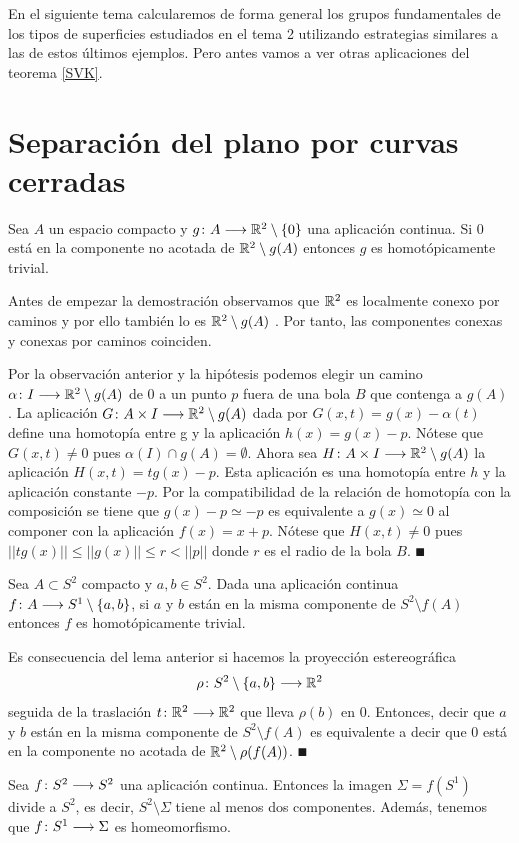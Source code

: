 \documentclass[GTS.tex]{subfiles}
\begin{document}
\vspace{0.4cm}

En el siguiente tema calcularemos de forma general los grupos fundamentales de los tipos de superficies estudiados en el tema 2 utilizando estrategias similares a las de estos últimos ejemplos. Pero antes vamos a ver otras aplicaciones del teorema \ref{SVK}.

\section{Separación del plano por curvas cerradas}

\begin{lemma}
Sea $A$ un espacio compacto y $g\colon{A}\longrightarrow{\mathbb{R}^2\setminus\{0\}}$ una aplicación continua. Si $0$ está en la componente no acotada de $\mathbb{R}^2\setminus g(A)$  entonces $g$ es homotópicamente trivial.
\end{lemma}

Antes de empezar la demostración observamos que $\mathbb{R}^2$ es localmente conexo por caminos y por ello también lo es $\mathbb{R}^2\setminus g(A)$ . Por tanto, las componentes conexas y conexas por caminos coinciden.

\begin{dem}
Por la observación anterior y la hipótesis podemos elegir un camino $\alpha\colon{I}\longrightarrow{\mathbb{R}^2\setminus g(A)}$ de $0$ a un punto $p$ fuera de una bola $B$ que contenga a $g(A)$. La aplicación $G\colon{A\times I}\longrightarrow{\mathbb{R}^2\setminus g(A)}$ dada por $G(x,t)=g(x)-\alpha(t)$ define una homotopía entre g y la aplicación $h(x)=g(x)-p$. Nótese que $G(x,t)\neq 0$ pues $\alpha(I)\cap g(A)=\emptyset$. Ahora sea $H\colon{A\times I}\longrightarrow{\mathbb{R}^2\setminus g(A)}$ la aplicación $H(x,t)=tg(x)-p$. Esta aplicación es una homotopía entre $h$ y la aplicación constante $-p$. Por la compatibilidad de la relación de homotopía con la composición se tiene que $g(x)-p\simeq -p$ es equivalente a $g(x)\simeq 0$ al componer con la aplicación $f(x)=x+p$. Nótese que $H(x,t)\neq 0$ pues $||tg(x)||\leq||g(x)||\leq r <||p||$ donde $r$ es el radio de la bola $B$. $\QED$
\end{dem}

\begin{lemma}
Sea $A\subset S^2$ compacto y $a,b\in S^2$. Dada una aplicación continua $f\colon{A}\longrightarrow{S^1\setminus\{a,b\}}$, si $a$ y $b$ están en la misma componente de $S^2\setminus f(A)$ entonces $f$ es homotópicamente trivial. 
\end{lemma}

\begin{dem}
Es consecuencia del lema anterior si hacemos la proyección estereográfica \[\rho\colon{S^2\setminus\{a,b\}}\longrightarrow{\mathbb{R}^2}\] seguida de la traslación $t\colon{\mathbb{R}^2}\longrightarrow{\mathbb{R}^2}$ que lleva $\rho(b)$ en $0$. Entonces, decir que $a$ y $b$ están en la misma componente de $S^2\setminus f(A)$ es equivalente a decir que $0$ está en la componente no acotada de $\mathbb{R}^2\setminus\rho(f(A))$. $\QED$
\end{dem}

\begin{prop}
Sea $f\colon{S^2}\longrightarrow{S^2}$ una aplicación continua. Entonces la imagen $\Sigma=f(S^1)$ divide a $S^2$, es decir, $S^2\setminus\Sigma$ tiene al menos dos componentes. Además, tenemos que $f\colon{S^1}\longrightarrow{\Sigma}$ es homeomorfismo.
\end{prop}
\end{document}
